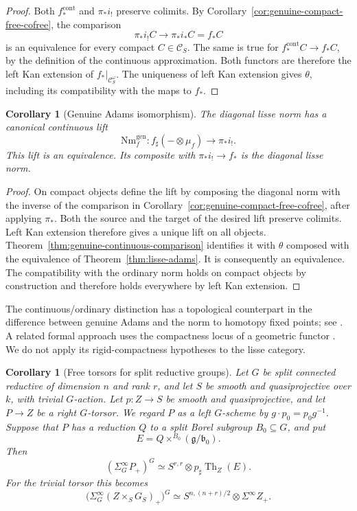 \documentclass[11pt,reqno]{amsart}
\newtheorem{corollary}[theorem]{Corollary}
\theoremstyle{definition}
\theoremstyle{remark}
\theoremstyle{plain}
\numberwithin{equation}{section}
\DeclareMathOperator{\Th}{Th}
\newcommand{\cont}{\mathrm{cont}}
\begin{document}
\begin{proof}
Both \(f_*^{\cont}\) and \(\pi_*i_!\) preserve colimits.
By Corollary~\ref{cor:genuine-compact-free-cofree}, the comparison
\[
 \pi_*i_!C\longrightarrow\pi_*i_*C=f_*C
\]
is an equivalence for every compact \(C\in\mathcal C_S\).
The same is true for \(f_*^{\cont} C\to f_*C\), by the definition of
the continuous approximation.
Both functors are therefore the left Kan extension of
\(f_*|_{\mathcal C_S^\omega}\).
The uniqueness of left Kan extension gives \(\theta\), including its
compatibility with the maps to \(f_*\).
\end{proof}

\begin{corollary}[Genuine Adams isomorphism]
\label{cor:genuine-adams-repaired}
The diagonal lisse norm has a canonical continuous lift
\[
 \mathrm{Nm}^{\mathrm{gen}}_f:
 f_\sharp(-\otimes\mu_f)\longrightarrow\pi_*i_!.
\]
This lift is an equivalence.
Its composite with \(\pi_*i_!\to f_*\) is the diagonal lisse norm.
\end{corollary}

\begin{proof}
On compact objects define the lift by composing the diagonal norm
with the inverse of the comparison in
Corollary~\ref{cor:genuine-compact-free-cofree}, after applying \(\pi_*\).
Both the source and the target of the desired lift preserve colimits.
Left Kan extension therefore gives a unique lift on all objects.
Theorem~\ref{thm:genuine-continuous-comparison} identifies it with
\(\theta\) composed with the equivalence of Theorem~\ref{thm:lisse-adams}.
It is consequently an equivalence.
The compatibility with the ordinary norm holds on compact objects
by construction and therefore holds everywhere by left Kan extension.
\end{proof}

The continuous/ordinary distinction has a topological counterpart in
the difference between genuine Adams and the norm to homotopy
fixed points; see
\cite[Theorem~5.2.5 and Remark~5.2.6]{RognesDualizable}.
A related formal approach uses the compactness locus of a geometric
functor \cite[Theorems~1.4 and~2.9, Section~3]{SandersAdams}.
We do not apply its rigid-compactness hypotheses to the lisse category.

\begin{corollary}[Free torsors for split reductive groups]
\label{cor:explicit-free-reductive-splitting}
Let \(G\) be split connected reductive of dimension \(n\)
and rank \(r\), and let \(S\) be smooth and quasiprojective
over \(k\), with trivial \(G\)-action.
Let \(p:Z\to S\) be smooth and quasiprojective, and let
\(P\to Z\) be a right \(G\)-torsor.
We regard \(P\) as a left \(G\)-scheme by
\(g\cdot p_0=p_0g^{-1}\).
Suppose that \(P\) has a reduction \(Q\) to a split Borel
subgroup \(B_0\subseteq G\), and put
\[
 E=Q\times^{B_0}(\mathfrak g/\mathfrak b_0).
\]
Then
\[
 (\Sigma_G^\infty P_+)^G
 \simeq S^{r,r}\otimes p_\sharp\Th_Z(E).
\]
For the trivial torsor this becomes
\[
 \bigl(\Sigma_G^\infty(Z\times_S G_S)_+\bigr)^G
 \simeq S^{n,(n+r)/2}\otimes\Sigma^\infty Z_+.
\]
\end{corollary}
\end{document}
